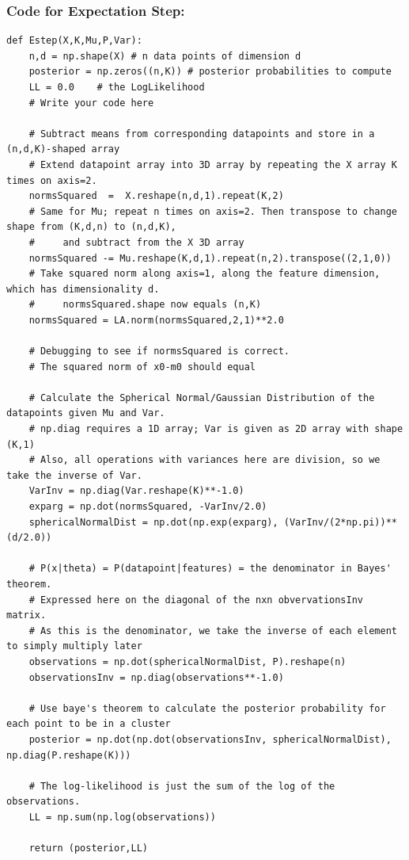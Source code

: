 \documentclass{article}
\begin{document}
\subsubsection*{Code for Expectation Step: }
    \begin{lstlisting}
def Estep(X,K,Mu,P,Var):
    n,d = np.shape(X) # n data points of dimension d
    posterior = np.zeros((n,K)) # posterior probabilities to compute
    LL = 0.0    # the LogLikelihood
    # Write your code here

    # Subtract means from corresponding datapoints and store in a (n,d,K)-shaped array
    # Extend datapoint array into 3D array by repeating the X array K times on axis=2.
    normsSquared  =  X.reshape(n,d,1).repeat(K,2)
    # Same for Mu; repeat n times on axis=2. Then transpose to change shape from (K,d,n) to (n,d,K),
    #     and subtract from the X 3D array
    normsSquared -= Mu.reshape(K,d,1).repeat(n,2).transpose((2,1,0))
    # Take squared norm along axis=1, along the feature dimension, which has dimensionality d.
    #     normsSquared.shape now equals (n,K)
    normsSquared = LA.norm(normsSquared,2,1)**2.0

    # Debugging to see if normsSquared is correct.
    # The squared norm of x0-m0 should equal
    
    # Calculate the Spherical Normal/Gaussian Distribution of the datapoints given Mu and Var.
    # np.diag requires a 1D array; Var is given as 2D array with shape (K,1)
    # Also, all operations with variances here are division, so we take the inverse of Var.
    VarInv = np.diag(Var.reshape(K)**-1.0)
    exparg = np.dot(normsSquared, -VarInv/2.0)
    sphericalNormalDist = np.dot(np.exp(exparg), (VarInv/(2*np.pi))**(d/2.0))

    # P(x|theta) = P(datapoint|features) = the denominator in Bayes' theorem.
    # Expressed here on the diagonal of the nxn obvervationsInv matrix.
    # As this is the denominator, we take the inverse of each element to simply multiply later
    observations = np.dot(sphericalNormalDist, P).reshape(n)
    observationsInv = np.diag(observations**-1.0)

    # Use baye's theorem to calculate the posterior probability for each point to be in a cluster
    posterior = np.dot(np.dot(observationsInv, sphericalNormalDist), np.diag(P.reshape(K)))

    # The log-likelihood is just the sum of the log of the observations.
    LL = np.sum(np.log(observations))
    
    return (posterior,LL)
\end{lstlisting}
\pagebreak
\end{document}
